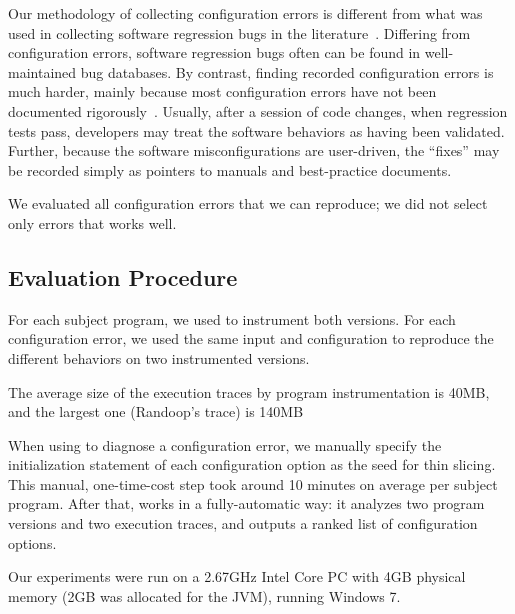 Our methodology of collecting
configuration errors is different from what was used in
collecting software regression bugs in the literature~\cite{dd, autoflow}.
Differing from configuration errors,
software regression bugs often can be found in well-maintained
bug databases. By contrast, finding recorded configuration errors
is much harder, mainly because most configuration errors have not been
documented rigorously~\cite{Yin:2011:ESC}. Usually, after a
session of code changes, when regression tests pass, developers
may treat the software behaviors as having been validated. Further,
because the software misconfigurations are user-driven,
the ``fixes'' may be recorded simply as pointers
to manuals and best-practice documents. 

We evaluated all configuration errors that we can reproduce;
we did not select only errors that \ourtool works well.





\subsection{Evaluation Procedure}

For each subject program, we used \ourtool to instrument both versions. 
For each configuration error, we used the same 
input and configuration
to reproduce the different behaviors on two instrumented versions.

The average size of the execution traces by program instrumentation is 40MB,
and the largest one (Randoop's trace) is 140MB



When using \ourtool to diagnose a configuration error, we manually specify
the initialization statement of each configuration option as
the seed for thin slicing. This manual, one-time-cost step took around
10 minutes on average per subject program. After that,
\ourtool works in a fully-automatic way: it 
analyzes two program versions and two execution traces,
and outputs a ranked list of configuration options.

Our experiments were run on a 2.67GHz Intel Core PC
with 4GB physical memory (2GB was allocated for the JVM),
running Windows 7.

